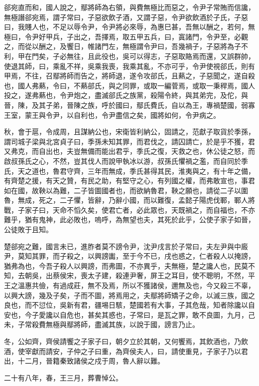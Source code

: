 \begin{pinyinscope}
郤宛直而和，國人說之，鄢將師為右領，與費無極比而惡之，令尹子常賄而信讒，無極譖郤宛焉，謂子常曰，子惡欲飲子酒，又謂子惡，令尹欲飲酒於子氏，子惡曰，我賤人也，不足以辱令尹，令尹將必來辱，為惠巳甚，吾無以酬之，若何，無極曰，令尹好甲兵，子出之，吾擇焉，取五甲五兵，曰，寘諸門，令尹至，必觀之，而從以酬之，及饗日，帷諸門左，無極謂令尹曰，吾幾禍子，子惡將為子不利，甲在門矣，子必無往，且此役也，吳可以得志，子惡取賂焉而還，又誤群帥，使退其師，曰，乘亂不祥，吳乘我喪，我乘其亂，不亦可乎，令尹使視郤氏，則有甲焉，不往，召鄢將師而告之，將師退，遂令攻郤氏，且爇之，子惡聞之，遂自殺也，國人弗爇，令曰，不爇郤氏，與之同罪，或取一編菅焉，或取一秉稈焉，國人投之，遂弗爇也，令尹炮之，盡滅郤氏之族黨，殺陽令終，與其弟完，及佗，與晉，陳，及其子弟，晉陳之族，呼於國曰，鄢氏費氏，自以為王，專禍楚國，弱寡王室，蒙王與令尹，以自利也，令尹盡信之矣，國將如何，令尹病之。

秋，會于扈，令成周，且謀納公也，宋衛皆利納公，固請之，范獻子取貨於季孫，謂司城子梁與北宮貞子曰，季孫未知其罪，而君伐之，請囚請亡，於是乎不獲，君又弗克，而自出也，夫豈無備而能出君乎，季氏之復，天救之也，休公徒之怒，而啟叔孫氏之心，不然，豈其伐人而說甲執冰以游，叔孫氏懼禍之濫，而自同於季氏，天之道也，魯君守齊，三年而無成，季氏甚得其民，淮夷與之，有十年之備，有齊楚之援，有天之贊，有民之助，有堅守之心，有列國之權，而弗敢宣也，事君如在國，故鞅以為難，二子皆圖國者也，而欲納魯君，鞅之願也，請從二子以圍魯，無成，死之，二子懼，皆辭，乃辭小國，而以難復，孟懿子陽虎伐鄆，鄆人將戰，子家子曰，天命不慆久矣，使君亡者，必此眾也，天既禍之，而自福也，不亦難乎，猶有鬼神，此必敗也，嗚呼，為無望也夫，其死於此乎，公使子家子如晉，公徒敗于且知。

楚郤宛之難，國言未已，進胙者莫不謗令尹，沈尹戌言於子常曰，夫左尹與中廄尹，莫知其罪，而子殺之，以興謗讟，至于今不已，戌也惑之，仁者殺人以掩謗，猶弗為也，今吾子殺人以興謗，而弗圖，不亦異乎，夫無極，楚之讒人也，民莫不知，去朝吳，出蔡侯宋，喪太子建，殺連尹奢，屏王之耳目，使不聰明，不然，平王之溫惠共儉，有過成莊，無不及焉，所以不獲諸侯，邇無及也，今又殺三不辜，以興大謗，幾及子矣，子而不圖，將焉用之，夫鄢將師矯子之命，以滅三族，國之良也，而不愆位，吳新有君，疆埸日駭，楚國若有大事，子其危哉，知者除讒以自安也，今子愛讒以自危也，甚矣其惑也，子常曰，是瓦之罪，敢不良圖，九月，己未，子常殺費無極與鄢將師，盡滅其族，以說于國，謗言乃止。

冬，公如齊，齊侯請饗之子家子曰，朝夕立於其朝，又何饗焉，其飲酒也，乃飲酒，使宰獻而請安，子仲之子曰重，為齊侯夫人，曰，請使重見，子家子乃以君出，十二月，晉籍秦致諸侯之戍于周，魯人辭以難。

二十有八年，春，王三月，葬曹悼公。


\end{pinyinscope}
